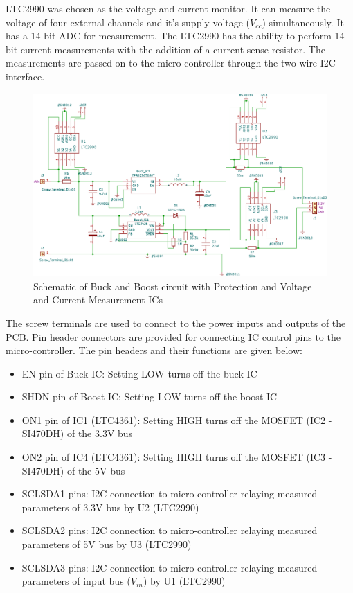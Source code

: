  LTC2990 was chosen as the voltage  and current monitor. It can measure the voltage of four external channels and it's supply voltage ($V_{cc}$) simultaneously. It has a 14 bit ADC for measurement. The LTC2990 has the ability to perform 14-bit current measurements with the addition of a current sense resistor. The measurements are passed on to the micro-controller through the two wire I2C interface.
 \begin{center}
 \begin{figure}[h]
 	\centering
 	\includegraphics[width=\columnwidth]{IMGS/1.pdf}
 	\caption{\centering Schematic of Buck and Boost circuit with Protection and Voltage and Current Measurement ICs}
 	\label{fig:bubo2}
 \end{figure}
\end{center}
The screw terminals are used to connect to the power inputs and outputs of the PCB. Pin header connectors are provided for connecting IC control pins to the micro-controller. The pin headers and their functions are given below:
 \begin{itemize}
 	\item EN pin of Buck IC: Setting LOW turns off the buck IC
 	\item SHDN pin of Boost IC: Setting LOW turns off the boost IC
 	\item ON1 pin of IC1 (LTC4361): Setting HIGH turns off the MOSFET (IC2 - SI470DH) of the 3.3V bus
 	\item ON2 pin of IC4 (LTC4361): Setting HIGH turns off the MOSFET (IC3 - SI470DH) of the 5V bus
 	\item SCLSDA1 pins: I2C connection to micro-controller relaying measured parameters of 3.3V bus by U2 (LTC2990) 
 	\item SCLSDA2 pins: I2C connection to micro-controller relaying measured parameters of 5V bus by U3 (LTC2990) 
 	\item SCLSDA3 pins: I2C connection to micro-controller relaying measured parameters of input bus ($V_{in}$) by U1 (LTC2990)
 \end{itemize}
\newpage
